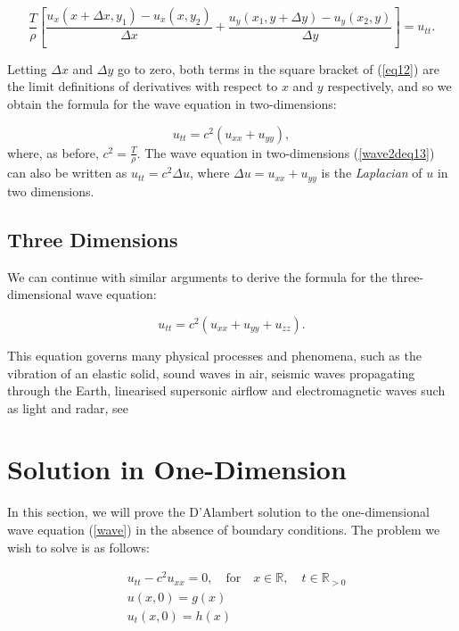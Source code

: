 \documentclass[a4paper, 12pt]{article}
\numberwithin{equation}{section}
\begin{document}
\begin{equation} \label{eq12}
    \frac{T}{\rho}\left[\frac{u_x(x+\Delta x, y_1)-u_x(x,y_2)}{\Delta x}+\frac{u_y(x_1,y+ \Delta y)-u_y(x_2,y)}{\Delta y}\right]=u_{tt}.
\end{equation}

Letting $\Delta x$ and $\Delta y$ go to zero, both terms in the square bracket
of (\ref{eq12}) are the limit definitions of derivatives with respect to $x$ and
$y$ respectively, and so we obtain the formula for the wave equation in
two-dimensions:

\begin{equation} \label{wave2deq13}
    u_{tt}=c^2(u_{xx}+u_{yy}),
\end{equation}
where, as before, $c^2=\frac{T}{\rho}$. The wave equation in two-dimensions
(\ref{wave2deq13}) can also be written as $u_{tt}=c^2\Delta u$, where $\Delta
u=u_{xx}+u_{yy}$ is the \emph{Laplacian} of $u$ in two dimensions.

\subsection{Three Dimensions}
We can continue with similar arguments to derive the formula for the
three-dimensional wave equation:

\begin {equation} \label{wave3deq14}
    u_{tt}=c^2(u_{xx}+u_{yy}+u_{zz}).
\end{equation}

This equation governs many physical processes and phenomena, such as the
vibration of an elastic solid, sound waves in air, seismic waves propagating
through the Earth, linearised supersonic airflow and electromagnetic waves such
as light and radar, see
\cite{Str}

\section{Solution in One-Dimension}
In this section, we will prove the D'Alambert solution to the one-dimensional
wave equation (\ref{wave}) in the absence of boundary conditions. The problem we
wish to solve is as follows:

\begin{equation} \label{ivp1d}
    \begin{aligned}
    &u_{tt}-c^2u_{xx}=0, \quad \textrm{for} \quad x\in \mathbb{R},\quad t\in \mathbb{R}_{>0}\\
    &u(x,0)=g(x)\\
    &u_t(x,0)=h(x)
    \end{aligned}
\end{equation}
\end{document}
